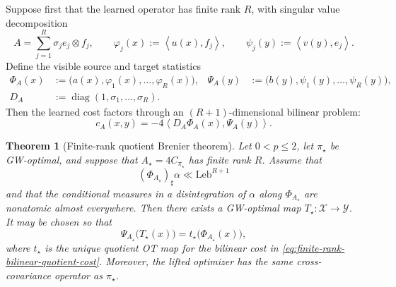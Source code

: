 \documentclass[11pt,a4paper]{article}
\newtheorem{theorem}{Theorem}[section]
\theoremstyle{definition}
\theoremstyle{remark}
\newcommand{\ip}[2]{\left\langle #1,#2\right\rangle}
\begin{document}
Suppose first that the learned operator has finite rank \(R\), with singular
value decomposition
\begin{equation}
  A=\sum_{j=1}^R\sigma_j e_j\otimes f_j,
  \qquad
  \varphi_j(x):=\ip{u(x)}{f_j},
  \qquad
  \psi_j(y):=\ip{v(y)}{e_j}.
  \label{eq:finite-rank-learned-operator}
\end{equation}
Define the visible source and target statistics
\begin{align}
  \Phi_A(x)&:=\bigl(a(x),\varphi_1(x),\ldots,\varphi_R(x)\bigr),
  &
  \Psi_A(y)&:=\bigl(b(y),\psi_1(y),\ldots,\psi_R(y)\bigr),
  \label{eq:finite-rank-quotient-features}\\
  D_A&:=\operatorname{diag}(1,\sigma_1,\ldots,\sigma_R).
  \label{eq:finite-rank-diagonal-operator}
\end{align}
Then the learned cost factors through an \((R+1)\)-dimensional bilinear
problem:
\begin{equation}
  c_A(x,y)=-4\ip{D_A\Phi_A(x)}{\Psi_A(y)}.
  \label{eq:finite-rank-bilinear-quotient-cost}
\end{equation}

\begin{theorem}[Finite-rank quotient Brenier theorem]
\label{thm:finite-rank-quotient-brenier}
Let \(0<p\leq2\), let \(\pi_\star\) be GW-optimal, and suppose that
\(A_\star=4C_{\pi_\star}\) has finite rank \(R\).  Assume that
\begin{equation}
  (\Phi_{A_\star})_\sharp\alpha\ll\mathrm{Leb}^{R+1}
  \label{eq:finite-rank-quotient-density}
\end{equation}
and that the conditional measures in a disintegration of \(\alpha\) along
\(\Phi_{A_\star}\) are nonatomic almost everywhere.  Then there exists a
GW-optimal map \(T_\star:\mathcal X\to\mathcal Y\).  It may be chosen so
that
\begin{equation}
  \Psi_{A_\star}\bigl(T_\star(x)\bigr)
  =t_\star\bigl(\Phi_{A_\star}(x)\bigr),
  \label{eq:finite-rank-lifted-map}
\end{equation}
where \(t_\star\) is the unique quotient OT map for the bilinear cost in
\eqref{eq:finite-rank-bilinear-quotient-cost}.  Moreover, the lifted
optimizer has the same cross-covariance operator as \(\pi_\star\).
\end{theorem}
\end{document}
